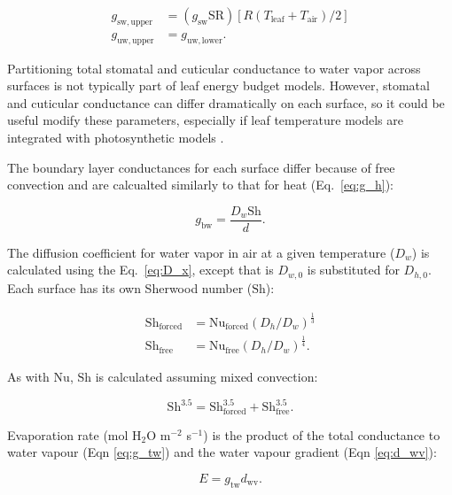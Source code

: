 \documentclass[11pt, oneside]{article}
\begin{document}
\begin{align}
  g_\mathrm{sw,upper} & = (g_\mathrm{sw} \mathrm{SR}) [R (T_\mathrm{leaf} + T_\mathrm{air}) / 2] \\
  g_\mathrm{uw,upper} & = g_\mathrm{uw,lower}.
\end{align}

Partitioning total stomatal and cuticular conductance to water vapor across surfaces is not typically part of leaf energy budget models. However, stomatal \citep{Muir_2015} and cuticular \citep{Karbulkova_etal_2008} conductance can differ dramatically on each surface, so it could be useful modify these parameters, especially if leaf temperature models are integrated with photosynthetic models \citep{Muir_2019c}.

The boundary layer conductances for each surface differ because of free convection \citep{Foster_Smith_1986} and are calcualted similarly to that for heat (Eq.~\ref{eq:g_h}):

\begin{equation}
  g_\mathrm{bw} = \frac{D_w \mathrm{Sh}}{d}.
\end{equation}

The diffusion coefficient for water vapor in air at a given temperature ($D_w$) is calculated using the Eq.~\ref{eq:D_x}, except that is $D_{w,0}$ is substituted for $D_{h,0}$. Each surface has its own Sherwood number ($\mathrm{Sh}$):

\begin{align}
  \mathrm{Sh}_\mathrm{forced} & = \mathrm{Nu}_\mathrm{forced} (D_h / D_w) ^ \frac{1}{3} \\
  \mathrm{Sh}_\mathrm{free} & = \mathrm{Nu}_\mathrm{free} (D_h / D_w) ^ \frac{1}{4}.
\end{align}

As with $\mathrm{Nu}$, $\mathrm{Sh}$ is calculated assuming mixed convection:

\begin{equation}
  \label{eq:sherwood}
  \mathrm{Sh} ^ {3.5} = \mathrm{Sh}_\mathrm{forced} ^ {3.5} + \mathrm{Sh}_\mathrm{free} ^ {3.5}.
\end{equation}

Evaporation rate (mol H$_2$O m$^{-2}$ s$^{-1}$) is the product of the total conductance to water vapour (Eqn \ref{eq:g_tw}) and the water vapour gradient (Eqn \ref{eq:d_wv}):

\begin{equation}
  E = g_\mathrm{tw} d_\mathrm{wv}.
\end{equation}
\end{document}
